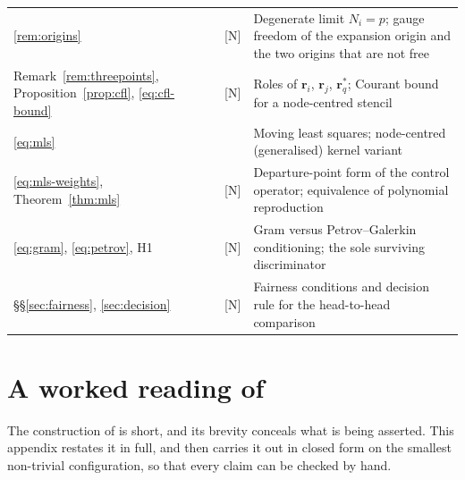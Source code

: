 \documentclass[11pt,a4paper]{article}
\renewcommand{\arraystretch}{1.2}
\newenvironment{widetable}
  {\begingroup\small\setlength{\tabcolsep}{4pt}%
   \renewcommand{\arraystretch}{1.15}%
   \setlength{\LTpre}{0.8em}\setlength{\LTpost}{0.8em}}
  {\endgroup}
\newcommand{\New}{\textcolor{blue!60!black}{\textsf{[N]}}}
\begin{document}
\begin{widetable}
\begin{longtable}{@{}P{3.9cm}P{4.45cm}P{7.3cm}@{}}
\ref{rem:origins} & \New & Degenerate limit $N_i=p$; gauge freedom of the expansion
origin and the two origins that are not free \\
Remark~\ref{rem:threepoints}, Proposition~\ref{prop:cfl}, \eqref{eq:cfl-bound} & \New &
Roles of $\bm r_i$, $\bm r_j$, $\bm r^{*}_q$; Courant bound for a node-centred stencil \\
\eqref{eq:mls} & \cite{Lancaster1981,Mirzaei2012,Trask2016} & Moving least squares;
node-centred (generalised) kernel variant \\
\eqref{eq:mls-weights}, Theorem~\ref{thm:mls} & \New & Departure-point form of the
control operator; equivalence of polynomial reproduction \\
\eqref{eq:gram}, \eqref{eq:petrov}, H1 & \New & Gram versus Petrov--Galerkin
conditioning; the sole surviving discriminator \\
\S\S\ref{sec:fairness}, \ref{sec:decision} & \New & Fairness conditions and decision
rule for the head-to-head comparison \\
\end{longtable}
\end{widetable}

\section{A worked reading of \texorpdfstring{\cite[\S 3.1]{KLN2020}}{King et al. Sec. 3.1}}
\label{app:tutorial}

The construction of \cite[\S 3.1]{KLN2020} is short, and its brevity conceals what is
being asserted. This appendix restates it in full, and then carries it out in closed
form on the smallest non-trivial configuration, so that every claim can be checked by
hand.
\end{document}
